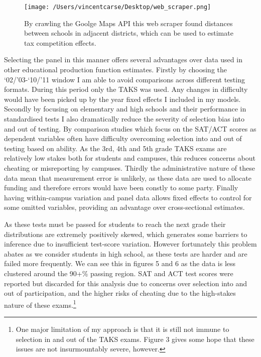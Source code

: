 \documentclass[11pt]{article}
\begin{document}
\begin{figure}
    \label{image-myimage}
    \texttt{[image: /Users/vincentcarse/Desktop/web\_scraper.png]}
    \caption{By crawling the Goolge Maps API this web scraper found distances between schools in adjacent districts, which can be used to estimate tax competition effects.}
\end{figure}

Selecting the panel in this manner offers several advantages over data used in other educational production function estimates. Firstly by choosing the ‘02/’03-‘10/’11 window I am able to avoid comparisons across different testing formats. During this period only the TAKS was used. Any changes in difficulty would have been picked up by the year fixed effects I included in my models. Secondly by focusing on elementary and high schools and their performance in standardised tests I also dramatically reduce the severity of selection bias into and out of testing. By comparison studies which focus on the SAT/ACT scores as dependent variables often have difficulty overcoming selection into and out of testing based on ability. As the 3rd, 4th and 5th grade TAKS exams are relatively low stakes both for students and campuses, this reduces concerns about cheating or misreporting by campuses. Thirdly the administrative nature of these data mean that measurement error is unlikely, as these data are used to allocate funding and therefore errors would have been constly to some party. Finally having within-campus variation and panel data allows fixed effects to control for some omitted variables, providing an advantage over cross-sectional estimates. 

As these tests must be passed for students to reach the next grade their distributions are extremely positively skewed, which generates some barriers to inference due to insufficient test-score variation. However fortunately this problem abates as we consider students in high school, as these tests are harder and are failed more frequently. We can see this in figures 5 and 6 as the data is less clustered around the 90+\% passing region. SAT and ACT test scores were reported but discarded for this analysis due to concerns over selection into and out of participation, and the higher risks of cheating due to the high-stakes nature of these exams.\footnote{One major limitation of my approach is that it is still not immune to selection in and out of the TAKS exams. Figure 3 gives some hope that these issues are not insurmountably severe, however.}
\end{document}

